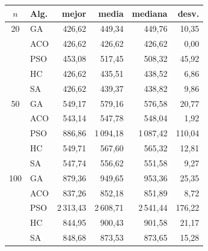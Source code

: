 \begin{tabular}{clrrrr}
\toprule
$n$ & Alg. & mejor & media & mediana & desv. \\
\midrule
20 & GA & 426{,}62 & 449{,}34 & 449{,}76 & 10{,}35 \\
 & ACO & 426{,}62 & 426{,}62 & 426{,}62 & 0{,}00 \\
 & PSO & 453{,}08 & 517{,}45 & 508{,}32 & 45{,}92 \\
 & HC & 426{,}62 & 435{,}51 & 438{,}52 & 6{,}86 \\
 & SA & 426{,}62 & 439{,}37 & 438{,}82 & 9{,}86 \\
\midrule
50 & GA & 549{,}17 & 579{,}16 & 576{,}58 & 20{,}77 \\
 & ACO & 543{,}14 & 547{,}78 & 548{,}04 & 1{,}92 \\
 & PSO & 886{,}86 & 1\,094{,}18 & 1\,087{,}42 & 110{,}04 \\
 & HC & 549{,}71 & 567{,}60 & 565{,}32 & 12{,}81 \\
 & SA & 547{,}74 & 556{,}62 & 551{,}58 & 9{,}27 \\
\midrule
100 & GA & 879{,}36 & 949{,}65 & 953{,}36 & 25{,}35 \\
 & ACO & 837{,}26 & 852{,}18 & 851{,}89 & 8{,}72 \\
 & PSO & 2\,313{,}43 & 2\,608{,}71 & 2\,541{,}44 & 176{,}22 \\
 & HC & 844{,}95 & 900{,}43 & 901{,}58 & 21{,}17 \\
 & SA & 848{,}68 & 873{,}53 & 873{,}65 & 15{,}28 \\
\bottomrule
\end{tabular}

